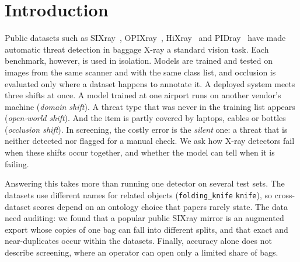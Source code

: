 \documentclass[10pt,twocolumn,letterpaper]{article}
\begin{document}
\section{Introduction}
\label{sec:intro}
Public datasets such as SIXray~\cite{miao2019sixray}, OPIXray~\cite{wei2020opixray}, HiXray~\cite{tao2021hixray} and PIDray~\cite{wang2021pidray} have made automatic threat detection in baggage X-ray a standard vision task. Each benchmark, however, is used in isolation. Models are trained and tested on images from the same scanner and with the same class list, and occlusion is evaluated only where a dataset happens to annotate it. A deployed system meets three shifts at once. A model trained at one airport runs on another vendor's machine (\emph{domain shift}). A threat type that was never in the training list appears (\emph{open-world shift}). And the item is partly covered by laptops, cables or bottles (\emph{occlusion shift}). In screening, the costly error is the \emph{silent} one: a threat that is neither detected nor flagged for a manual check. We ask how X-ray detectors fail when these shifts occur together, and whether the model can tell when it is failing.

Answering this takes more than running one detector on several test sets. The datasets use different names for related objects (\eg \texttt{folding\_knife} \vs \texttt{knife}), so cross-dataset scores depend on an ontology choice that papers rarely state. The data need auditing: we found that a popular public SIXray mirror is an augmented export whose copies of one bag can fall into different splits, and that exact and near-duplicates occur within the datasets. Finally, accuracy alone does not describe screening, where an operator can open only a limited share of bags.
\end{document}
